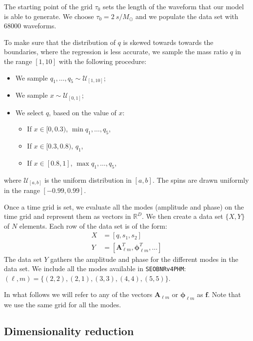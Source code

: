 \documentclass[twocolumn,showpacs,preprintnumbers,nofootinbib,prd,
superscriptaddress,10pt]{revtex4-1}
\newcommand{\R}{\mathbb{R}}
\begin{document}
The starting point of the grid $\tau_0$ sets the length of the waveform that our model is able to generate. 
We choose $\tau_0 = \SI{2}{s/M_\odot}$ and we populate the data set with $68000$ waveforms.

To make sure that the distribution of $q$ is skewed towards towards the boundaries, where the regression is less accurate, we sample the mass ratio $q$ in the range $[1,10]$ with the following procedure:
\begin{itemize}
	\item We sample $q_1, \hdots, q_5 \sim \mathcal{U}_{[1,10]}$;
	\item We sample $x \sim \mathcal{U}_{[0,1]}$;
	\item We select $q$, based on the value of $x$:
	\begin{itemize}
		\item If $x \in [0,0.3)$, $\min q_1, \hdots, q_5$,
		\item If $x \in [0.3, 0.8)$, $q_1$,
		\item If $x \in [0.8, 1]$, $\max q_1, \hdots, q_5$,
	\end{itemize}
\end{itemize}
where $\mathcal{U}_{[a,b]}$ is the uniform distribution in $[a,b]$.
The spins are drawn uniformly in the range $[-0.99, 0.99]$.

Once a time grid is set, we evaluate all the modes (amplitude and phase) on the time grid and represent them as vectors in $\R^D$.
We then create a data set $\{X, Y\}$ of $N$ elements. Each row of the data set is of the form:
\begin{align}
	X &= [q, s_1, s_2] \\
	Y &= [\boldsymbol{A}^T_{\ell m}, \boldsymbol{\phi}^T_{\ell m}, \hdots ] 
\end{align}
%
The data set $Y$ gathers the amplitude and phase for the different modes in the data set.
We include all the modes available in \texttt{SEOBNRv4PHM}: $(\ell, m) = \{(2,2),(2,1), (3,3), (4,4), (5,5)\}$.

In what follows we will refer to any of the vectors $\boldsymbol{A}_{\ell m}$ or $\boldsymbol{\phi}_{\ell m}$ as $\boldsymbol{f}$.
Note that we use the same grid for all the modes.

\subsection{Dimensionality reduction}
\label{sec:PCA}
\end{document}
